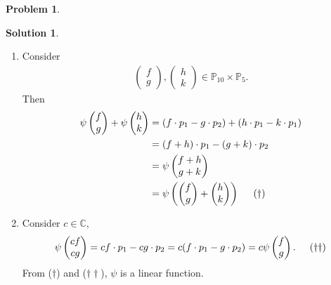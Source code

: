 \documentclass{book}
\theoremstyle{definition}
\newtheorem*{prob*}{Problem}
\newtheorem*{sln*}{Solution}
\begin{document}
\begin{prob*}
\begin{sln*}
\begin{enumerate}
	\begin{enumerate}
		\item Consider 
		\begin{align*}
		\begin{pmatrix}
		f\\g
		\end{pmatrix},
		\begin{pmatrix}
		h\\k
		\end{pmatrix} \in \mathbb{P}_{10}\times \mathbb{P}_5.
		\end{align*}
		Then
		\begin{align*}
		\psi\begin{pmatrix}
		f\\g
		\end{pmatrix}
		+
		\psi\begin{pmatrix}
		h\\k
		\end{pmatrix}
		&=
		(f\cdot p_1 - g\cdot p_2) + (h\cdot p_1 - k\cdot p_1)\\ 
		&= (f+h)\cdot p_1 - (g+k)\cdot p_2 \\
		&= \psi\begin{pmatrix}
		f+h\\g+k
		\end{pmatrix}\\
		&= \psi\left(\begin{pmatrix}
		f\\g
		\end{pmatrix}+ \begin{pmatrix}
		h\\k
		\end{pmatrix}\right)\hspace{0.5cm}(\dagger)
		\end{align*}
		\item Consider $c\in \mathbb{C} $, 
		\begin{align*}
		\psi \begin{pmatrix}
		cf \\ cg
		\end{pmatrix} = cf\cdot p_1 - cg\cdot p_2 = c(f \cdot p_1 - g \cdot p_2) = c\psi\begin{pmatrix}
		f\\g
		\end{pmatrix}.\hspace{0.5cm}(\dagger\dagger)
		\end{align*}
		From ($\dagger$) and ($\dagger\dagger$), $\psi$ is a linear function.
		

\end{enumerate}
\end{enumerate}
\end{sln*}
\end{prob*}
\end{document}
